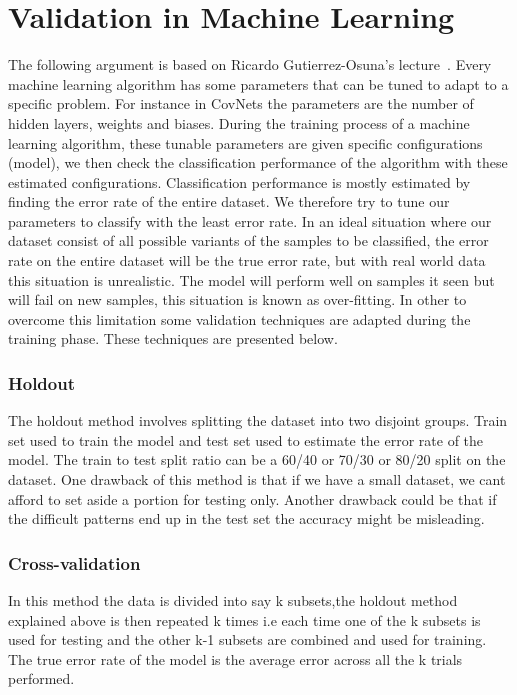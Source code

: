 \documentclass[12pt, a4paper,oneside]{report}
\begin{document}
\section{Validation in Machine Learning}
The following argument is based on Ricardo Gutierrez-Osuna's lecture~\cite{validation}.
Every machine learning algorithm has some parameters that can be tuned to adapt to a specific problem. For instance in CovNets the parameters are the number of hidden layers, weights and biases. 
During the training process of a machine learning algorithm, these tunable parameters are given specific configurations (model), we then check the classification performance of the algorithm with these estimated configurations. Classification performance is mostly estimated by finding the error rate of the entire dataset. We therefore try to tune our parameters to classify with the least error rate. In an ideal situation where our dataset consist of all possible variants of the samples to be classified, the error rate on the entire dataset will be the true error rate, but with real world data this situation is unrealistic. The model will perform well on samples it seen but will fail on new samples, this situation is known as over-fitting. In other to overcome this limitation some validation techniques are adapted during the training phase. These techniques are presented below.

\subsubsection{Holdout}
The holdout method involves splitting the dataset into two disjoint groups. Train set used to train the model and test set used to estimate the error rate of the model. The train to test split ratio can be a 60/40 or 70/30 or 80/20 split on the dataset. One drawback of this method is that if we have a small dataset, we cant afford to set aside a portion for testing only. Another drawback could be that if the difficult patterns end up in the test set the accuracy might be misleading.

\subsubsection{Cross-validation}
In this method the data is divided into say k subsets,the holdout method explained above is then repeated k times i.e each time one of the k subsets is used for testing and the other k-1 subsets are combined and used for training. The true error rate of the model is the average error across all the k trials performed.
\end{document}
